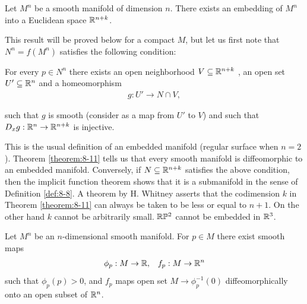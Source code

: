 \begin{theorem}\label{theorem:8-11}
  Let $M^n$ be a smooth manifold of dimension $n$. There exists an
  embedding of $M^n$ into a Euclidean space $\mathbb{R}^{n+k}$.
\end{theorem}

This result will be proved below for a compact $M$, but let us first note that
$N^n = f(M^n)$ satisfies the following condition:

For every $p\in N^n$ there exists an open neighborhood $V\subseteq\mathbb{R}^{n+k}$ , an open set
$U'\subseteq\mathbb{R}^n$ and a homeomorphism
\begin{align*}
  g:U'\to N\cap V,
\end{align*}

such that $g$ is smooth (consider as a map from $U'$ to $V$) and such that $D_xg:\mathbb{R}^n\to\mathbb{R}^{n+k}$ is
injective.

This is the usual definition of an embedded manifold (regular surface when $n = 2$).
Theorem \ref{theorem:8-11} tells us that every smooth manifold is diffeomorphic to an embedded
manifold. Conversely, if $N\subseteq\mathbb{R}^{n+k}$ satisfies the above condition, then the implicit
function theorem shows that it is a submanifold in the sense of Definition \ref{def:8-8}.
A theorem by H. Whitney asserts that the codimension $k$ in Theorem \ref{theorem:8-11} can
always be taken to be less or equal to $n + 1$. On the other hand $k$ cannot be
arbitrarily small. $\mathbb{R}\mathbb{P}^2$ cannot be embedded in $\mathbb{R}^3$.


\begin{lemma}\label{lemma:8-12}
  Let $M^n$ be an $n$-dimensional smooth manifold. For $p\in M$ there exist smooth maps
  \begin{align*}
    \phi_p:M\to \mathbb{R}, && f_p:M\to \mathbb{R}^n
  \end{align*}
  such that $\phi_p(p)>0$, and $f_p$ maps open set $M\to \phi_p^{-1}(0)$ diffeomorphically onto 
  an open subset  of $\mathbb{R}^n$.
\end{lemma}

